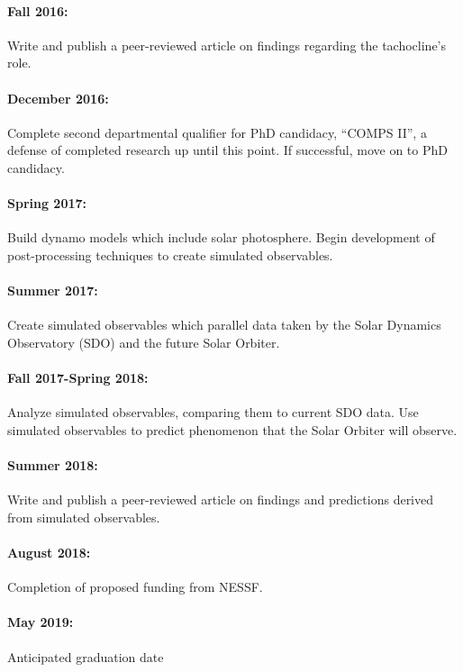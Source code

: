 \documentclass[aasms,12pt]{article}
\begin{document}
\vspace{-0.4cm}
\paragraph{Fall 2016:} Write and publish a peer-reviewed article on findings
regarding the tachocline's role.

\vspace{-0.4cm}
\paragraph{December 2016:} Complete second departmental qualifier for PhD candidacy,
``COMPS II'', a defense of completed research up until this point.  If successful,
move on to PhD candidacy.

\vspace{-0.4cm}
\paragraph{Spring 2017:} Build dynamo models which include solar photosphere.
Begin development of post-processing techniques to create simulated observables.

\vspace{-0.4cm}
\paragraph{Summer 2017:} Create simulated observables which parallel data taken
by the Solar Dynamics Observatory (SDO) and the future Solar Orbiter.

\vspace{-0.4cm}
\paragraph{Fall 2017-Spring 2018:} Analyze simulated observables, comparing them to current
SDO data.  Use simulated observables to predict phenomenon that the Solar Orbiter
will observe.

\vspace{-0.4cm}
\paragraph{Summer 2018:} Write and publish a peer-reviewed article on findings
and predictions derived from simulated observables.

\vspace{-0.4cm}
\paragraph{August 2018:} Completion of proposed funding from NESSF.

\vspace{-0.4cm}
\paragraph{May 2019:} Anticipated graduation date
\end{document}
